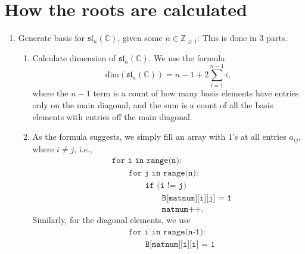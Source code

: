 \documentclass[12pt]{article}
\theoremstyle{definition}
\theoremstyle{definition}
\begin{document}
    \section{How the roots are calculated}
    \begin{enumerate}
        \item Generate basis for $\mathfrak{sl}_n(\mathbb{C})$, given some
            $n\in\mathbb{Z}_{\geq 1}$: This is done in 3 parts.
            \begin{enumerate}
                \item Calculate dimension of $\mathfrak{sl}_n(\mathbb{C})$. We
                    use the formula 
                    \begin{equation*}
                        \text{dim}(\mathfrak{sl}_n(\mathbb{C}))=n-1+2\sum_{i=1}^{n-1}i,
                    \end{equation*}
                    where the $n-1$ term is a count of how many basis elements have
                    entries only on the main diagonal, and the sum is a count of
                    all the basis elements with entries off the main diagonal.
                \item As the formula suggests, we simply fill an array with 1's at
                    all entries $a_{ij}$, where $i\neq j$, i.e., 
                    \begin{equation*}
                        \begin{split}
                            &\texttt{for i in range(n):} \\
                            &\quad\quad\texttt{for j in range(n):} \\
                            &\quad\quad\quad\quad\texttt{if (i != j)} \\
                            &\quad\quad\quad\quad\quad\quad\texttt{B[matnum][i][j] = 1} \\ 
                            &\quad\quad\quad\quad\quad\quad\texttt{matnum++}.
                        \end{split} 
                    \end{equation*}
                    Similarly, for the diagonal elements, we use 
                    \begin{equation*}
                        \begin{split}
                            &\texttt{for i in range(n-1):} \\
                            &\quad\quad\texttt{B[matnum][i][i] = 1} \\

\end{split}
\end{equation*}
\end{enumerate}
\end{enumerate}
\end{document}
